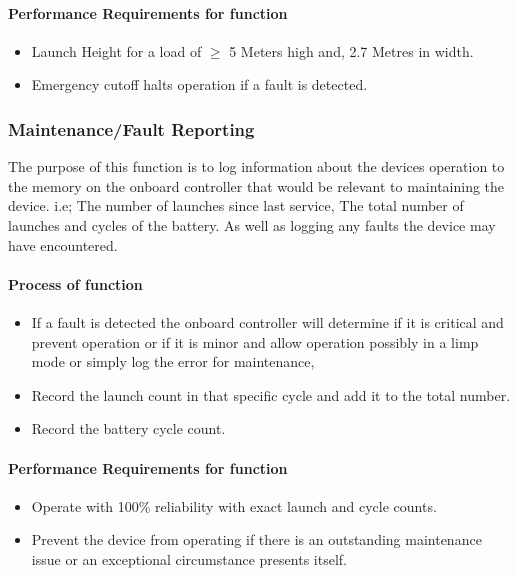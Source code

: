 \documentclass[a4paper,10pt]{article} %
\begin{document}
\paragraph{Performance Requirements for function}

\begin{itemize}
    \item Launch Height for a load of $\geq$ 5 Meters high and, 2.7 Metres in width.
    \item Emergency cutoff halts operation if a fault is detected.
\end{itemize}

\newpage

\subsubsection{Maintenance/Fault Reporting}

The purpose of this function is to log information about the devices operation to the memory on the onboard controller that would be relevant to maintaining the device. i.e; The number of launches since last service, The total number of launches and cycles of the battery. As well as logging any faults the device may have encountered.

\paragraph{Process of function}

\begin{itemize}
    \item If a fault is detected the onboard controller will determine if it is critical and prevent operation or if it is minor and allow operation possibly in a limp mode or simply log the error for maintenance,
    \item Record the launch count in that specific cycle and add it to the total number.
    \item Record the battery cycle count.
\end{itemize}

\paragraph{Performance Requirements for function}

\begin{itemize}
    \item Operate with 100\% reliability with exact launch and cycle counts.
    \item Prevent the device from operating if there is an outstanding maintenance issue or an exceptional circumstance presents itself.
\end{itemize}
\end{document}
